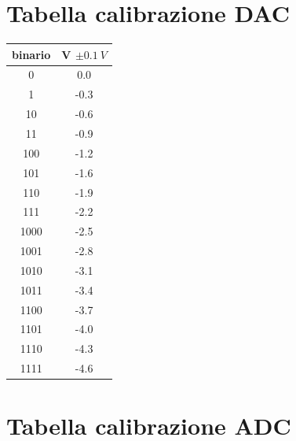 \documentclass[journal]{IEEEtran}
\begin{document}
\begin{appendices}

\section{Tabella calibrazione DAC}

\centering
\begin{tabular}{cc}
binario & V $ \pm 0.1 \ V $ \\ \hline
0       & 0.0                          \\
1       & -0.3                       \\
10      & -0.6                       \\
11      & -0.9                       \\
100     & -1.2                       \\
101     & -1.6                       \\
110     & -1.9                       \\
111     & -2.2                       \\
1000    & -2.5                       \\
1001    & -2.8                       \\
1010    & -3.1                       \\
1011    & -3.4                       \\
1100    & -3.7                       \\
1101    & -4.0                       \\
1110    & -4.3                       \\
1111    & -4.6
\vspace{5 mm}
\label{tab:calibrazione_dac}
\end{tabular}


\section{Tabella calibrazione ADC}


\end{appendices}
\end{document}
